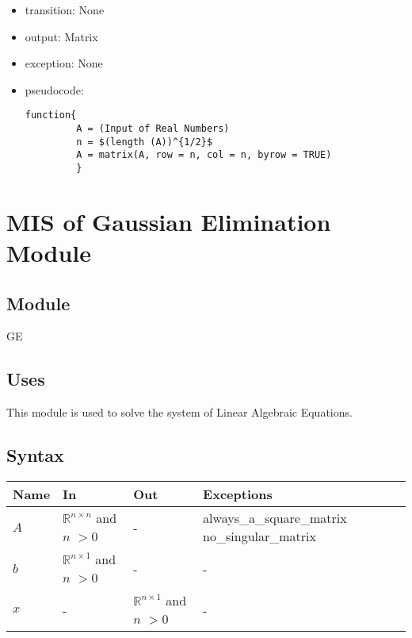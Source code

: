 \documentclass[12pt, titlepage]{article}
\begin{document}
\noindent %
\begin{itemize}
\item transition: None%
\item output: Matrix 
\item exception: None%
\item pseudocode:

\begin{lstlisting}
function{
         A = (Input of Real Numbers)
         n = $(length (A))^{1/2}$
         A = matrix(A, row = n, col = n, byrow = TRUE)
         }
\end{lstlisting}

\end{itemize}

\newpage


\section{MIS of {Gaussian Elimination  Module}} \label{modge}

\subsection{Module}

GE


\subsection{Uses}
This module is used to solve the system of Linear Algebraic Equations.


\subsection{Syntax}

\begin{center}
\begin{tabular}{p{2cm} p{4cm} p{4cm} p{2cm}}
\hline
\textbf{Name} & \textbf{In} & \textbf{Out} & \textbf{Exceptions} \\
\hline

$A$ & $\mathbb{R}^{n \times n}$ and $n$ $> 0$ & - & always\_a\_square\_matrix no\_singular\_matrix\\
$b$ & $\mathbb{R}^{n \times 1}$ and $n$ $> 0$ & - & - \\
$x$ & - & $\mathbb{R}^{n \times 1}$ and $n$ $> 0$ & - \\
\hline
\end{tabular}
\end{center}
\end{document}

